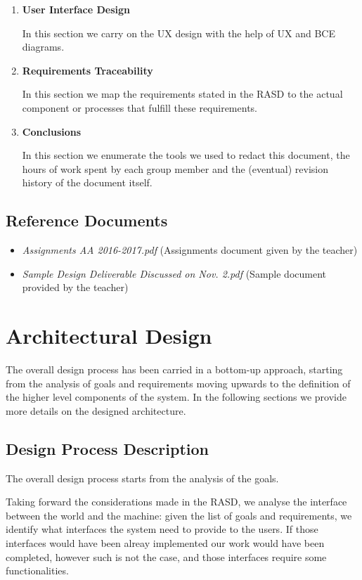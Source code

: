 \documentclass[11pt]{article} %
\begin{document}
\begin{enumerate}
	\item \textbf{User Interface Design}

	In this section we carry on the UX design with the help of UX and BCE diagrams.

	\item \textbf{Requirements Traceability}
	
	In this section we map the requirements stated in the RASD to the actual component or processes that fulfill these requirements.

	\item \textbf{Conclusions}

	In this section we enumerate the tools we used to redact this document, the hours of work spent by each group member and the (eventual) revision history of the document itself.
\end{enumerate}

\subsection{Reference Documents}
\begin{itemize}
	\item \textit{Assignments AA 2016-2017.pdf} (Assignments document given by the teacher)
	\item \textit{Sample Design Deliverable Discussed on Nov. 2.pdf} (Sample document provided by the teacher)
  \end{itemize}




\newpage
\section{Architectural Design}
The overall design process has been carried in a bottom-up approach, starting from the analysis of goals and requirements moving upwards to the definition of the higher level components of the system. In the following sections we provide more details on the designed architecture.

\subsection{Design Process Description}

The overall design process starts from the analysis of the goals. 

Taking forward the considerations made in the RASD, we analyse the interface between the world and the machine: given the list of goals and requirements, we identify what interfaces the system need to provide to the users.
If those interfaces would have been alreay implemented our work would have been completed, however such is not the case, and those interfaces require some functionalities.
\end{document}
